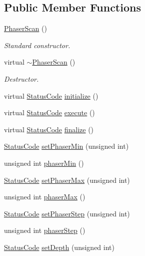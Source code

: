 \subsection*{Public Member Functions}
\begin{DoxyCompactItemize}
\item 
\hyperlink{classPhaserScan_afba6f21affa3e014fe4019dfd9664672}{Phaser\+Scan} ()
\begin{DoxyCompactList}\small\item\em Standard constructor. \end{DoxyCompactList}\item 
virtual \hyperlink{classPhaserScan_a861dfecc0610514a146c300a7458bad5}{$\sim$\+Phaser\+Scan} ()
\begin{DoxyCompactList}\small\item\em Destructor. \end{DoxyCompactList}\item 
virtual \hyperlink{classStatusCode}{Status\+Code} \hyperlink{classPhaserScan_aeb0dccb02754b11c19719962f7c43fb8}{initialize} ()
\item 
virtual \hyperlink{classStatusCode}{Status\+Code} \hyperlink{classPhaserScan_abf8e9639bcbbd23ec1a9a8e04319d9d1}{execute} ()
\item 
virtual \hyperlink{classStatusCode}{Status\+Code} \hyperlink{classPhaserScan_a505bd8dc2961fd220f1624cd949a266e}{finalize} ()
\item 
\hyperlink{classStatusCode}{Status\+Code} \hyperlink{classPhaserScan_abc98adb04157f08d1c1ba99eee527a37}{set\+Phaser\+Min} (unsigned int)
\item 
unsigned int \hyperlink{classPhaserScan_ab24e5fc6e36639ce31faf430ca87afc9}{phaser\+Min} ()
\item 
\hyperlink{classStatusCode}{Status\+Code} \hyperlink{classPhaserScan_ad968ae47c77c7813caf69cc22ff40559}{set\+Phaser\+Max} (unsigned int)
\item 
unsigned int \hyperlink{classPhaserScan_a2cccb1c5b687c5cdf934dd3eb11a73ad}{phaser\+Max} ()
\item 
\hyperlink{classStatusCode}{Status\+Code} \hyperlink{classPhaserScan_a99ff5030b4e551437796c5614f92fffd}{set\+Phaser\+Step} (unsigned int)
\item 
unsigned int \hyperlink{classPhaserScan_a8bebde600274e342a78783e49917b64d}{phaser\+Step} ()
\item 
\hyperlink{classStatusCode}{Status\+Code} \hyperlink{classPhaserScan_a182d5a23019a62c3c3ad3a03f5187036}{set\+Depth} (unsigned int)
\item 

\end{DoxyCompactItemize}

